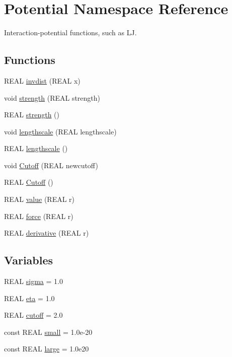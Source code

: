 \hypertarget{namespacePotential}{
\section{Potential Namespace Reference}
\label{namespacePotential}
}
Interaction-potential functions, such as LJ.  


\subsection*{Functions}
\begin{CompactItemize}
\item 
REAL \hyperlink{namespacePotential_918dd94d2cedd4fe3ca3fa920b6d7fef}{invdist} (REAL x)
\item 
void \hyperlink{namespacePotential_40f447bd2b6382c6a6e9170bcba9538a}{strength} (REAL strength)
\item 
REAL \hyperlink{namespacePotential_dddc93ac78511fe0bb740eb7f60c0586}{strength} ()
\item 
void \hyperlink{namespacePotential_cd514cd5456126aec5806df5bf4c606d}{lengthscale} (REAL lengthscale)
\item 
REAL \hyperlink{namespacePotential_97fea8d42e4e224a7f7aba10ef59a9ad}{lengthscale} ()
\item 
void \hyperlink{namespacePotential_623b983939aa06313660e1e37d796ddc}{Cutoff} (REAL newcutoff)
\item 
REAL \hyperlink{namespacePotential_4a1d0ff492f72f8a5962f07f483caa1f}{Cutoff} ()
\item 
REAL \hyperlink{namespacePotential_b53f8127419fc9606a455218ad347074}{value} (REAL r)
\item 
REAL \hyperlink{namespacePotential_3e887e85d927abdab55e33b9a1b5f9a9}{force} (REAL r)
\item 
REAL \hyperlink{namespacePotential_1bbfae0bac5bc358795ba5de0c255cb3}{derivative} (REAL r)
\end{CompactItemize}
\subsection*{Variables}
\begin{CompactItemize}
\item 
REAL \hyperlink{namespacePotential_96d3dd69513cd1b108741e2211f882fc}{sigma} = 1.0
\item 
REAL \hyperlink{namespacePotential_ad12486731103b0c2bdaa0bae4c54ef2}{eta} = 1.0
\item 
REAL \hyperlink{namespacePotential_c816a0c081c354415b591e3ae74b0503}{cutoff} = 2.0
\item 
const REAL \hyperlink{namespacePotential_556740887ab207a8ffabed2dd038e04e}{small} = 1.0e-20
\item 
const REAL \hyperlink{namespacePotential_dd2f57d7529aa1e7619eb04e15732890}{large} = 1.0e20
\end{CompactItemize}


